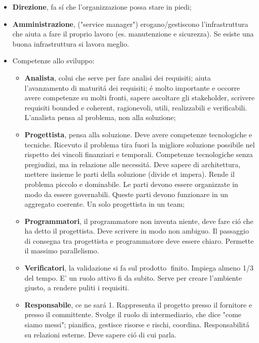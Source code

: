 \documentclass[10pt]{article}
\begin{document}
\begin{itemize}
\begin{itemize}
\item \textbf{Direzione}, fa s\'i che l'organizzazione possa stare in piedi;

\item \textbf{Amministrazione}, ("service manager") erogano/gestiscono 
l'infrastruttura che aiuta a fare il proprio lavoro (es. manutenzione e 
sicurezza). Se esiste una buona infrastruttura si 
lavora meglio.


	\item Competenze allo sviluppo:
	\begin{itemize}
		
	\item \textbf{Analista}, colui che serve per fare analisi dei requisiti; 
	aiuta l'avanzamento di maturit\'a dei requisiti; \'e
	molto importante e occorre avere competenze su molti fronti, sapere 
	ascoltare gli stakeholder, scrivere requisiti bounded e coherent, 
	ragionevoli, utili, realizzabili e verificabili. L'analista pensa al 
	problema, non alla soluzione;
	
	
	\item \textbf{Progettista}, pensa alla soluzione. Deve avere competenze 
	tecnologiche e tecniche. Ricevuto il problema tira fuori la migliore 
	soluzione possibile nel rispetto dei vincoli finanziari e temporali. 
	Competenze tecnologiche senza pregiudizi, ma in relazione alle necessit\'a. 
	Deve sapere di architettura, mettere insieme le parti della soluzione 
	(divide et impera). Rende il problema piccolo e dominabile. Le
	parti devono essere organizzate in modo da essere governabili. Queste parti 
	devono funzionare in un aggregato coerente. Un solo progettista in un team;
	
	
	\item \textbf{Programmatori}, il programmatore non inventa niente, deve 
	fare ci\'o che ha detto il progettista. Deve scrivere in modo non ambiguo. 
	Il passaggio di consegna tra progettista e programmatore deve essere
	chiaro. Permette il massimo parallelismo. 
	
	
	\item \textbf{Verificatori}, la validazione si fa sul prodotto finito. 
	Impiega almeno 1/3 del tempo. E' un ruolo attivo fi da subito. Serve per 
	creare l'ambiente giusto, a rendere puliti i 
	requisiti.
	
	
	\item \textbf{Responsabile}, ce ne sar\'a 1. Rappresenta il progetto presso 
	il fornitore e presso il committente. Svolge il ruolo di intermediario, che 
	dice "come siamo messi"; pianifica, gestisce risorse e rischi,
	coordina. Responsabilit\'a su relazioni esterne. Deve sapere ci\'o di cui 
	parla. 



\end{itemize}
\end{itemize}
\end{itemize}
\end{document}

